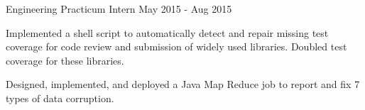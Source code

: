 \begin{cventries}
  \cventry
    {Engineering Practicum Intern} %
    {} %
    {} %
    {May 2015 - Aug 2015} %
    {
      \begin{cvitems} %
        \item {Implemented a shell script to automatically detect and repair missing test coverage for code review and submission of widely used libraries. Doubled test coverage for these libraries.}
        \item {Designed, implemented, and deployed a Java Map Reduce job to report and fix 7 types of data corruption.}
      \end{cvitems}
    }




\end{cventries}
